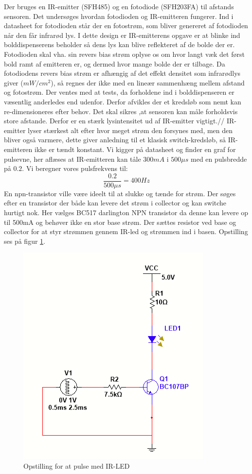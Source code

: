 \documentclass[Rapport/Rapport_main.tex]{subfiles}
\begin{document}
Der bruges en IR-emitter (SFH485) og en fotodiode (SFH203FA) til afstands sensoren. Det undersøges hvordan fotodioden og IR-emitteren fungerer. Ind i datasheet for fotodioden står der en fotostrøm, som bliver genereret af fotodioden når den får infrarød lys. I dette design er IR-emitterens opgave er at blinke ind bolddispenserens beholder så dens lys kan blive reflekteret af de bolde der er. Fotodioden skal vha. sin revers bias strøm oplyse os om hvor langt væk det først bold ramt af emitteren er, og dermed hvor mange bolde der er tilbage. Da fotodiodens revers bias strøm er afhængig af det effekt densitet som infrarødlys giver ($mW/cm^2$), så regnes der ikke med en lineær sammenhæng mellem afstand og fotostrøm.
Der ventes med at tests, da forholdene ind i bolddispenseren er væsentlig anderledes end udenfor. Derfor afvikles der et kredsløb som nemt kan re-dimensioneres efter behov. Det skal sikres ,at sensoren kan måle forholdsvis store afstande. Derfor er en stærk lysintensitet ud af IR-emitter vigtigt.//
IR-emitter lyser stærkest alt efter hvor meget strøm den forsynes med, men den bliver også varmere, dette giver anledning til et klasisk switch-kredsløb, så IR-emitteren ikke er tændt konstant. Vi kigger på datasheet og finder en graf for pulsevne, her aflæses at IR-emitteren kan tåle $300mA$ i $500\mu s$ med en pulsbredde på $0.2$. Vi beregner vores pulsfrekvens til:
\[\frac{0.2}{500\mu s}=400Hz\]
En npn-transistor ville være ideelt til at slukke og tænde for strøm. Der søges efter en transistor der både kan levere det strøm i collector og kan switche hurtigt nok. Her vælges BC517 darlington NPN transistor da denne kan levere op til 500mA og behøver ikke en stor base strøm. Der sættes resistor ved base og collector for at styr strømmen gennem IR-led og strømmen ind i basen. Opstilling ses på figur \ref{fig:IRLEDpuls}.
\begin{figure}[H]
    \centering
    \includegraphics{Rapport/BallDispenser/BallCountSensor/graphics/Opstilling1.png}
    \caption{Opstilling for at pulse med IR-LED}
    \label{fig:IRLEDpuls}
\end{figure}
\end{document}
